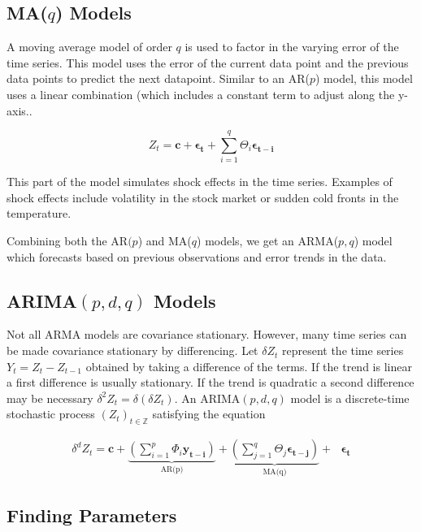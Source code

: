 \subsection*{MA($q$) Models} 

A moving average model of order $q$ is used to factor in the varying error of the time series.
This model uses the error of the current data point and the previous data points to predict the next datapoint.
Similar to an AR($p$) model, this model uses a linear combination (which includes a constant term to adjust along the y-axis..

\begin{equation}
Z_t = \mathbf{c} + \boldsymbol{\epsilon_t} + \sum_{i=1}^q\Theta_i\boldsymbol{\epsilon_{t-i}}
\label{eq:MA}
\end{equation}

This part of the model simulates shock effects in the time series.
Examples of shock effects include volatility in the stock market or sudden cold fronts in the temperature.

Combining both the AR$(p$) and MA($q$) models, we get an ARMA($p,q$) model which forecasts based on previous observations and error trends in the data.

\subsection*{ARIMA$(p,d,q)$ Models}

Not all ARMA models are covariance stationary. 
However, many time series can be made covariance stationary by differencing.
Let $\delta Z_t$ represent the time series $Y_t = Z_t - Z_{t-1}$ obtained by taking a difference of the terms. 
If the trend is linear a first difference is usually stationary.
If the trend is quadratic a second difference may be necessary $\delta ^2 Z_t = \delta ( \delta Z_t)$.
An $\text{ARIMA}(p,d,q)$ model is a discrete-time stochastic process $(Z_t)_{t \in \mathbb{Z}}$ satisfying the equation

\begin{align}
    \label{eq:arima:def}
    \delta ^ d Z_t = \mathbf{c} + \underbrace{\left(\sum_{i=1}^p \Phi_{i}\mathbf{y_{t - i}}\right)}_\text{AR(p)} +  
    \underbrace{\left(\sum_{j=1}^{q} \Theta_{j}\boldsymbol{\epsilon_{t-j}} \right)}_\text{MA(q)} + \text{ } \boldsymbol{\epsilon_t}
\end{align}


\subsection*{Finding Parameters}

